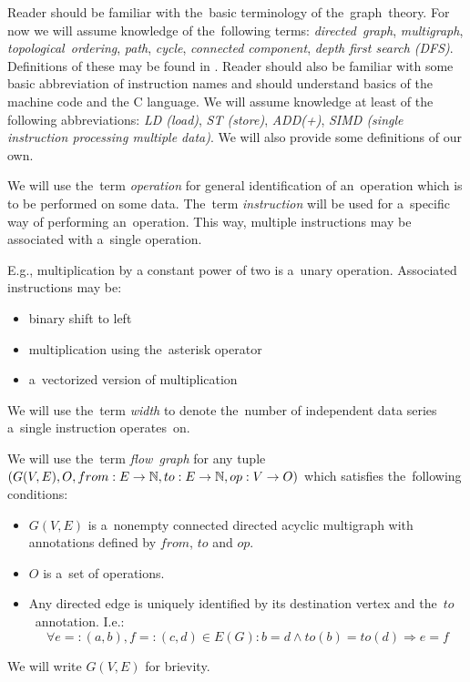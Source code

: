 Reader should be familiar with the~basic terminology of the~graph~theory. For now we will assume knowledge of the~following terms: \emph{directed~graph}, \emph{multigraph}, \emph{topological~ordering}, \emph{path}, \emph{cycle}, \emph{connected component}, \emph{depth first search (DFS)}. Definitions of these may be found in \cite{kapitoly}. Reader should also be familiar with some basic abbreviation of instruction names and should understand basics of the machine code and the C language. We will assume knowledge at least of the following abbreviations: \emph{LD (load)}, \emph{ST (store)}, \emph{ADD(+)}, \emph{SIMD (single instruction processing multiple data)}. We will also provide some definitions of our own.

\begin{define}
We will use the~term \emph{operation} for general identification of an~operation which is to be performed on some data. The~term \emph{instruction} will be used for a~specific way of performing an~operation. This way, multiple instructions may be associated with a~single operation.
\end{define}

E.g., multiplication by a constant power of two is a~unary operation. Associated instructions may be:
\begin{itemize}
  \item binary shift to left
  \item multiplication using the~asterisk operator
  \item a~vectorized version of multiplication
\end{itemize}

\begin{define}
We will use the~term \emph{width} to denote the~number of independent data series a~single instruction operates~on.
\end{define}

\begin{define}
We will use the~term \emph{flow~graph} for any tuple $(G(V,E),O,from:E \rightarrow \mathbb{N}, to:E \rightarrow \mathbb{N}, op:V \rightarrow O)$ which satisfies the~following conditions:
\begin{itemize}
  \item $G(V,E)$ is a~nonempty connected directed acyclic multigraph with annotations defined by $from$, $to$ and $op$.
  \item $O$ is a~set of operations.
  \item Any directed edge is uniquely identified by its destination vertex and the~$to$~annotation. I.e.:
    $$ \forall{e=:(a,b),f=:(c,d)} \in {E(G)}: b = d \wedge to(b) = to(d) \Rightarrow e = f $$
\end {itemize}
    We will write $G(V,E)$ for brievity.
\end{define}

